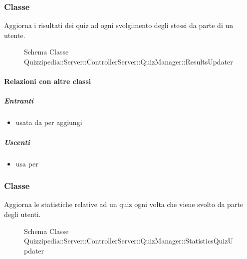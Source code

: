 \subsubsection{Classe }
Aggiorna i risultati dei quiz ad ogni svolgimento degli stessi da parte di un utente.
\begin{figure}[H]
\centering
\noindent{}
\caption[Schema Classe ResultsUpdater]{Schema Classe Quizzipedia::Server::ControllerServer::QuizManager::ResultsUpdater}
\end{figure}
\paragraph{Relazioni con altre classi}
\subparagraph{Entranti}
\begin{itemize}
\item usata da  per aggiungi
\end{itemize}
\subparagraph{Uscenti}
\begin{itemize}
\item usa  per 
\end{itemize}
\subsubsection{Classe }
Aggiorna le statistiche relative ad un quiz ogni volta che viene svolto da parte degli utenti.
\begin{figure}[H]
\centering
\noindent{}
\caption[Schema Classe StatisticsQuizUpdater]{Schema Classe Quizzipedia::Server::ControllerServer::QuizManager::StatisticsQuizUpdater}
\end{figure}
